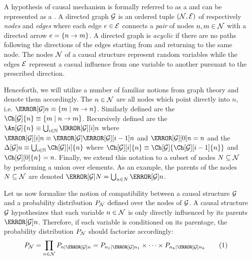 \documentclass[aps, 10pt, english, twoside, pra, nofootinbib, tightenlines, longbibliography, superscriptaddress]{revtex4-1}
\begin{document}
    A hypothesis of causal mechanism is formally referred to as a  and can be represented as a . A directed graph $\mathcal{G}$ is an ordered tuple $\br{\nodes, \edges}$ of respectively \textit{nodes} and \textit{edges} where each edge $e \in \mathcal{E}$ connects a \textit{pair} of nodes $n, m \in \mathcal{N}$ with a directed arrow $e = \bc{n \to m}$. A directed graph is \textit{acyclic} if there are no paths following the directions of the edges starting from and returning to the same node. The nodes $\mathcal{N}$ of a causal structure represent random variables while the edges $\mathcal{E}$ represent a casual influence from one variable to another pursuant to the prescribed direction.

    Henceforth, we will utilize a number of familiar notions from graph theory and denote them accordingly. The  $n \in \mathcal{N}$ are all nodes which point directly into $n$, i.e. $\Pa[\graph]{n} \defined \bc{m \mid m \to n}$. Similarly defined are the  $\Ch[\graph]{n} \defined \bc{m \mid n \to m}$. Recursively defined are the  $\An[\graph]{n} \defined \bigcup_{i\in\mathbb{N}} \Pa[\graph][i]{n}$ where $\Pa[\graph][i]{n} \defined \Pa[\graph]{\Pa[\graph][i-1]{n}}$ and $\Pa[\graph][0]{n} = n$ and the  $\De[\graph]{n} \defined \bigcup_{i\in\mathbb{N}} \Ch[\graph][i]{n}$ where $\Ch[\graph][i]{n} \defined \Ch[\graph]{\Ch[\graph][i-1]{n}}$ and $\Ch[\graph][0]{n} = n$. Finally, we extend this notation to a subset of nodes $N \subseteq \mathcal{N}$ by performing a union over elements. As an example, the parents of the nodes $N \subseteq \mathcal{N}$ are denoted $\Pa[\graph]{N} = \bigcup_{n \in N} \Pa[\graph]{n}$.

    Let us now formalize the notion of compatibility between a causal structure $\mathcal{G}$ and a probability distribution $\prob[\nodes]$ defined over the nodes of $\mathcal{G}$. A causal structure $\mathcal{G}$ hypothesizes that each variable $n \in \mathcal{N}$ is only directly influenced by its parents $\Pa[\graph]{n}$. Therefore, if each variable is conditioned on its parentage, the probability distribution $\prob[\nodes]$ should factorize accordingly:
    \[ \prob[\nodes] = \prod_{n \in \nodes} \prob[n \mid \Pa[\graph]{n}] = \prob[n_1 \mid \Pa[\graph]{n_1}] \times \cdots \times \prob[n_k \mid \Pa[\graph]{n_k}] \eq \label{eq:compatibility_as_factorization}\]
\end{document}
